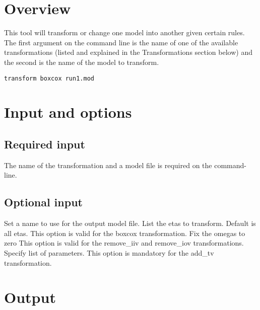 



\maketitle
\newcommand{\guidetoolname}{transform}


\section{Overview}
This tool will transform or change one model into another given certain rules. The first argument on the command line is the name of one of the available transformations (listed and explained in the Transformations section below) and the second is the name of the model to transform.

\begin{verbatim}
transform boxcox run1.mod
\end{verbatim}

\section{Input and options}

\subsection{Required input}
The name of the transformation and a model file is required on the command-line.


\subsection{Optional input}

\begin{optionlist}
Set a name to use for the output model file. 
\nextopt
{}
List the etas to transform. Default is all etas.
This option is valid for the boxcox transformation.
\nextopt
      Fix the omegas to zero
      This option is valid for the remove\_iiv and remove\_iov transformations.
    \nextopt
      Specify list of parameters.
      This option is mandatory for the add\_tv transformation.
    \nextopt
\end{optionlist}

\section{Output}

